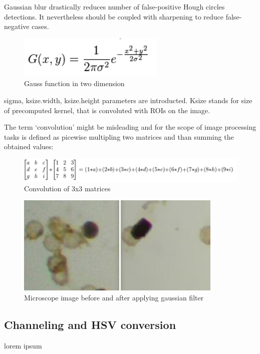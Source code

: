 \documentclass[12pt,twoside,a4paper]{article}
\begin{document}
Gaussian blur drastically reduces number of false-positive Hough circles detections. It nevertheless should be coupled with sharpening to reduce false-negative cases.\cite{cnoisy} 


\begin{figure}[H]
\centering
\includegraphics[width=0.4\paperwidth]{gauss}
\caption{Gauss function in two dimension\cite{featproc}}
\end{figure}


sigma, ksize.width, ksize.height  parameters are introducted. 
Ksize stands for size of precomputed kernel, that is convoluted with ROIs on the image.

The term ‘convolution’ might be misleading and for the scope of image processing tasks is defined as picewise multipling two matrices and than summing the obtained values:

 
\begin{figure}[H]
\centering
\includegraphics[width=0.8\paperwidth]{conv}
\caption{Convolution of 3x3 matrices\cite{gimp}}
\end{figure}

 
\begin{figure}[H]
\centering
\includegraphics[width=0.4\paperwidth]{micro}
\caption{Microscope image before and after applying gaussian filter\cite{cnoisy}}
\end{figure}

  


\subsection{Channeling and HSV conversion}
lorem ipsum
\end{document}
